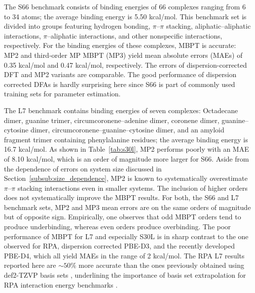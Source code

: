 \documentclass[journal=jctcce,manuscript=article]{achemso}
\begin{document}
The S66 benchmark consists of binding energies of 66 complexes ranging
from 6 to 34 atoms; the average binding energy is 5.50 kcal/mol.
\cite{doi:10.1021/ct2002946,doi:10.1021/ct200523a}
This benchmark set is divided into groups featuring hydrogen bonding, $\pi$--$\pi$
stacking, aliphatic--aliphatic interactions,  $\pi$--aliphatic interactions,
and other nonspecific interactions, respectively. For the binding energies of
these complexes, 
MBPT is accurate: MP2 and third-order MP MBPT (MP3) yield mean absolute
errors (MAEs) of 0.35 kcal/mol and 0.47 kcal/mol, respectively. The
errors of dispersion-corrected DFT and MP2 variants are comparable. The
good performance of dispersion corrected DFAs is hardly surprising here
since S66 is part of commonly used training sets for parameter
estimation. \cite{Caldeweyher17JChemPhys147p034112}

The L7 benchmark contains binding energies of seven complexes: Octadecane
dimer, guanine trimer, circumcoronene--adenine dimer, coronene dimer,
guanine--cytosine dimer, circumcoronene--guanine--cytosine dimer, and an
amyloid fragment trimer containing 
phenylalanine residues; the average binding energy is 16.7
  kcal/mol.\cite{doi:10.1021/ct400036b,doi:10.1063/1.5012601} As shown in 
Table~\ref{tab:s30l}, 
MP2 performs poorly with an MAE of 8.10 kcal/mol, which is an order of
magnitude more larger for S66. Aside from the dependence of errors on
system size 
discussed in Section~\ref{subsub:size_dependence}, MP2 is known to
systematically overestimate $\pi$--$\pi$ stacking interactions even in
smaller systems.\cite{doi:10.1021/ct2002946} The inclusion of higher
orders does not systematically improve the MBPT results. For both, the S66 
and L7 benchmark sets, MP2 and MP3 mean errors are on the same orders of
magnitude but of opposite sign. Empirically, one observes that odd MBPT orders
tend to produce underbinding, whereas even orders produce
overbinding.\cite{doi:10.1021/jp952815d,doi:10.1063/1.481764}
The poor performance of MBPT for L7 and especially S30L is
in sharp contrast to the one observed for RPA, dispersion corrected PBE-D3,
and the recently developed PBE-D4,\cite{Caldeweyher17JChemPhys147p034112}
which all yield MAEs in the range of 2 kcal/mol. The RPA L7 results
reported here are $\sim 50$\% more accurate than the ones previously
obtained using def2-TZVP basis sets \cite{doi:10.1021/acs.jctc.6b01235},
underlining the importance of basis set extrapolation for RPA
interaction energy benchmarks \cite{Eshuis12JChemPhys136p084105}. 
\end{document}
